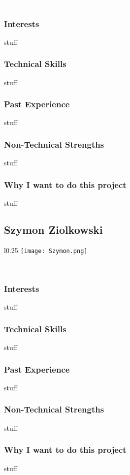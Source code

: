 \textcolor{white}{.}
\subsubsection{Interests} stuff
\subsubsection{Technical Skills} stuff
\subsubsection{Past Experience} stuff
\subsubsection{Non-Technical Strengths} stuff
\subsubsection{Why I want to do this project} stuff


\subsection{Szymon Ziolkowski}
\begin{wrapfigure}[5]{l}{0.25\textwidth}
\vspace{10pt}
\texttt{[image: Szymon.png]}
\end{wrapfigure}

\textcolor{white}{.}
\subsubsection{Interests}  stuff
\subsubsection{Technical Skills} stuff
\subsubsection{Past Experience} stuff
\subsubsection{Non-Technical Strengths} stuff
\subsubsection{Why I want to do this project} stuff


